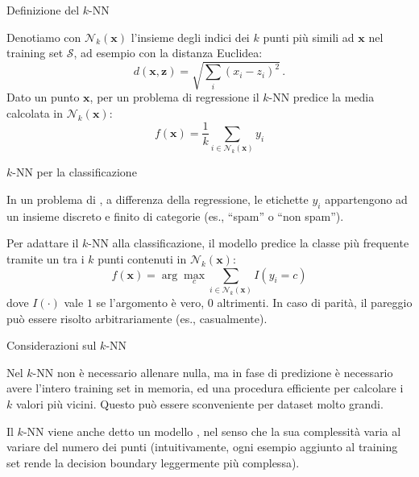 \documentclass[12pt,aspectratio=169]{beamer}
\begin{document}
\begin{frame}{Definizione del $k$-NN}

	Denotiamo con $\mathcal{N}_k(\mathbf{x})$ l'insieme degli indici dei $k$ punti più simili ad $\mathbf{x}$ nel training set $\mathcal{S}$, ad esempio con la distanza Euclidea:
	\begin{equation}
		d(\mathbf{x}, \mathbf{z}) = \sqrt{\sum_i (x_i-z_i)^2} \,.
	\end{equation}
	Dato un punto $\mathbf{x}$, per un problema di regressione il $k$-NN predice la media calcolata in $\mathcal{N}_k(\mathbf{x})$:
	\begin{equation}
		f(\mathbf{x}) = \frac{1}{k}\sum_{i \in \mathcal{N}_k(\mathbf{x})} y_i
	\end{equation}

\end{frame}

\begin{frame}{$k$-NN per la classificazione}

	In un problema di , a differenza della regressione, le etichette $y_i$ appartengono ad un insieme discreto e finito di categorie (es., ``spam'' o ``non spam'').

	Per adattare il $k$-NN alla classificazione, il modello predice la classe più frequente tramite un  tra i $k$ punti contenuti in $\mathcal{N}_k(\mathbf{x})$:
	\begin{equation}
		f(\mathbf{x}) = \arg\max_{c} \sum_{i \in \mathcal{N}_k(\mathbf{x})} I(y_i = c)
	\end{equation}
	dove $I(\cdot)$ vale $1$ se l'argomento è vero, $0$ altrimenti. In caso di parità, il pareggio può essere risolto arbitrariamente (es., casualmente).

\end{frame}

\begin{frame}{Considerazioni sul $k$-NN}

	Nel $k$-NN non è necessario allenare nulla, ma in fase di predizione è necessario avere l'intero training set in memoria, ed una procedura efficiente per calcolare i $k$ valori più vicini. Questo può essere sconveniente per dataset molto grandi.

	Il $k$-NN viene anche detto un modello , nel senso che la sua complessità varia al variare del numero dei punti (intuitivamente, ogni esempio aggiunto al training set rende la decision boundary leggermente più complessa).

\end{frame}
\end{document}
